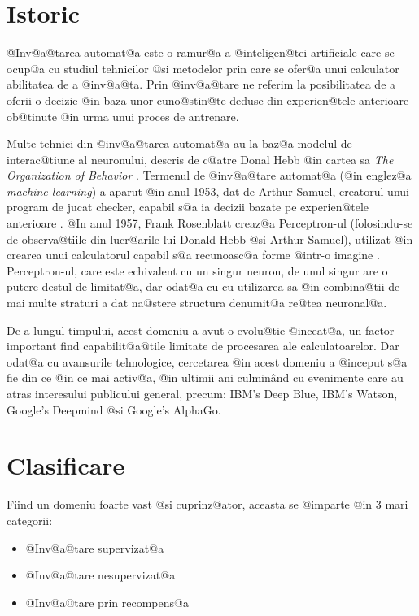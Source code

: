 \section{Istoric}

	@Inv@a@tarea automat@a este o ramur@a a @inteligen@tei artificiale care se ocup@a cu studiul tehnicilor @si metodelor prin care se ofer@a unui calculator abilitatea de a @inv@a@ta. Prin @inv@a@tare ne referim la posibilitatea de a oferii o decizie @in baza unor cuno@stin@te deduse din experien@tele anterioare ob@tinute @in urma unui proces de antrenare.

 Multe tehnici din @inv@a@tarea automat@a au la baz@a modelul de interac@tiune al neuronului, descris de c@atre Donal Hebb @in cartea sa {\sl The Organization of Behavior} \cite{donald-hebb-book}. Termenul de @inv@a@tare automat@a (@in englez@a {\sl machine learning}) a aparut @in anul 1953, dat de Arthur Samuel, creatorul unui program de jucat checker, capabil s@a ia decizii bazate pe experien@tele anterioare \cite{arthur-samuel}. @In anul 1957, Frank Rosenblatt creaz@a Perceptron-ul (folosindu-se de observa@tiile din lucr@arile lui Donald Hebb @si Arthur Samuel), utilizat @in crearea unui calculatorul capabil s@a recunoasc@a forme @intr-o imagine . Perceptron-ul, care este echivalent cu un singur neuron, de unul singur are o putere destul de limitat@a, dar odat@a cu cu  utilizarea sa @in combina@tii de mai multe straturi a dat na@stere structura denumit@a re@tea neuronal@a. 
 
 De-a lungul timpului, acest domeniu a avut o evolu@tie @inceat@a, un factor important find capabilit@a@tile limitate de procesarea ale calculatoarelor. Dar odat@a cu avansurile tehnologice, cercetarea @in acest domeniu a @inceput s@a fie din ce @in ce mai activ@a, @in ultimii ani culmin\^ and cu evenimente care au atras interesului publicului general, precum: IBM's Deep Blue, IBM's Watson, Google's Deepmind @si Google's AlphaGo.
 
 
\newpage

\section{Clasificare}

Fiind un domeniu foarte vast @si cuprinz@ator, aceasta se @imparte @in 3 mari categorii:
\hspace{0.2cm}\begin{itemize}
	\item @Inv@a@tare supervizat@a
	\item @Inv@a@tare nesupervizat@a
	\item @Inv@a@tare prin recompens@a
\end{itemize}

